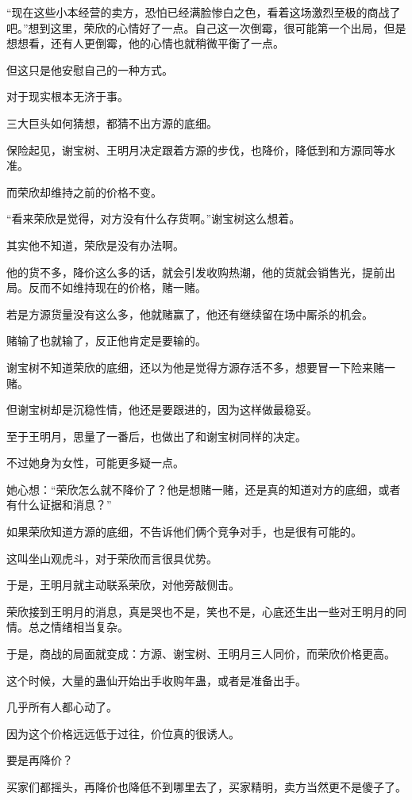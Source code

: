 \begin{this_body}
“现在这些小本经营的卖方，恐怕已经满脸惨白之色，看着这场激烈至极的商战了吧。”想到这里，荣欣的心情好了一点。自己这一次倒霉，很可能第一个出局，但是想想看，还有人更倒霉，他的心情也就稍微平衡了一点。

但这只是他安慰自己的一种方式。

对于现实根本无济于事。

三大巨头如何猜想，都猜不出方源的底细。

保险起见，谢宝树、王明月决定跟着方源的步伐，也降价，降低到和方源同等水准。

而荣欣却维持之前的价格不变。

“看来荣欣是觉得，对方没有什么存货啊。”谢宝树这么想着。

其实他不知道，荣欣是没有办法啊。

他的货不多，降价这么多的话，就会引发收购热潮，他的货就会销售光，提前出局。反而不如维持现在的价格，赌一赌。

若是方源货量没有这么多，他就赌赢了，他还有继续留在场中厮杀的机会。

赌输了也就输了，反正他肯定是要输的。

谢宝树不知道荣欣的底细，还以为他是觉得方源存活不多，想要冒一下险来赌一赌。

但谢宝树却是沉稳性情，他还是要跟进的，因为这样做最稳妥。

至于王明月，思量了一番后，也做出了和谢宝树同样的决定。

不过她身为女性，可能更多疑一点。

她心想：“荣欣怎么就不降价了？他是想赌一赌，还是真的知道对方的底细，或者有什么证据和消息？”

如果荣欣知道方源的底细，不告诉他们俩个竞争对手，也是很有可能的。

这叫坐山观虎斗，对于荣欣而言很具优势。

于是，王明月就主动联系荣欣，对他旁敲侧击。

荣欣接到王明月的消息，真是哭也不是，笑也不是，心底还生出一些对王明月的同情。总之情绪相当复杂。

于是，商战的局面就变成：方源、谢宝树、王明月三人同价，而荣欣价格更高。

这个时候，大量的蛊仙开始出手收购年蛊，或者是准备出手。

几乎所有人都心动了。

因为这个价格远远低于过往，价位真的很诱人。

要是再降价？

买家们都摇头，再降价也降低不到哪里去了，买家精明，卖方当然更不是傻子了。


\end{this_body}
